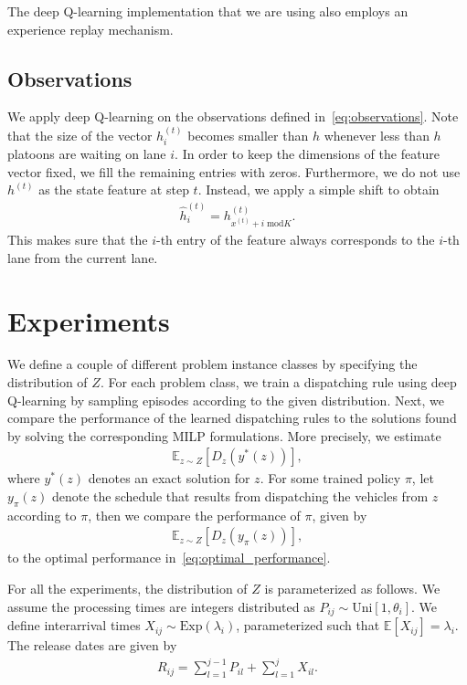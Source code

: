 \documentclass{article}
\theoremstyle{definition}
\theoremstyle{plain}
\begin{document}
The deep Q-learning implementation that we are using also employs an experience
replay mechanism.


\subsection{Observations}


We apply deep Q-learning on the observations defined in~\eqref{eq:observations}.
Note that the size of the vector $h_{i}^{(t)}$ becomes smaller than $h$ whenever
less than $h$ platoons are waiting on lane $i$. In order to keep the dimensions
of the feature vector fixed, we fill the remaining entries with zeros.
Furthermore, we do not use $h^{(t)}$ as the state feature at step $t$.
Instead, we apply a simple shift to obtain
\begin{align}
  \hat{h}_{i}^{(t)} = h_{x^{(t)} + i \; \text{mod} K}^{(t)} .
\end{align}
This makes sure that the $i$-th entry of the feature always corresponds to the
$i$-th lane from the current lane.


\section{Experiments}

We define a couple of different problem instance classes by specifying the
distribution of $Z$. For each problem class, we train a dispatching rule using
deep Q-learning by sampling episodes according to the given distribution. Next,
we compare the performance of the learned dispatching rules to the solutions
found by solving the corresponding MILP formulations. More precisely, we
estimate
\begin{align}
  \label{eq:optimal_performance}
  \mathbb{E}_{z \sim Z}\left[ D_{z}(y^{*}(z)) \right] ,
\end{align}
where $y^{*}(z)$ denotes an exact solution for $z$. For some trained policy
$\pi$, let $y_{\pi}(z)$ denote the schedule that results from dispatching the
vehicles from $z$ according to $\pi$, then we compare the performance of $\pi$,
given by
\begin{align}
  \mathbb{E}_{z \sim Z}\left[ D_{z}(y_{\pi}(z)) \right] ,
\end{align}
to the optimal performance in~\eqref{eq:optimal_performance}.

For all the experiments, the distribution of $Z$ is parameterized as follows.
We assume the processing times are integers distributed as
$P_{ij} \sim \text{Uni}[1, \theta_{i}]$.
We define interarrival times $X_{ij} \sim \text{Exp}(\lambda_{i})$, parameterized
such that $\mathbb{E}[X_{ij}] = \lambda_{i}$. The release dates are given by
\begin{align}
R_{ij} = \sum_{l=1}^{j-1} P_{il} + \sum_{l=1}^{j} X_{il} .
\end{align}
\end{document}
